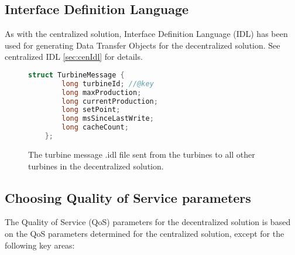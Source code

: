 \subsection{Interface Definition Language}\label{sec:decenIdl}

As with the centralized solution, Interface Definition Language (IDL) has been used for generating Data Transfer Objects for the decentralized solution. See centralized IDL \cref{sec:cenIdl} for details.

\begin{figure}[!h]
	\centering
	\begin{lstlisting}[language=C++,tabsize=2,basicstyle=\small]
	struct TurbineMessage {
		long turbineId; //@key
		long maxProduction;
		long currentProduction;
		long setPoint;
		long msSinceLastWrite;
		long cacheCount;
	};	
	\end{lstlisting}
	\caption[Decentralized turbine message]{
		\label{fig:decenTurbineMessage} 
		\footnotesize{%
			The turbine message .idl file sent from the turbines to all other turbines in the decentralized solution.
		}
	}
\end{figure}

\subsection{Choosing Quality of Service parameters}\label{sec:decenChoosingQoS}

The Quality of Service (QoS) parameters for the decentralized solution is based on the QoS parameters determined for the centralized solution, except for the following key areas:

